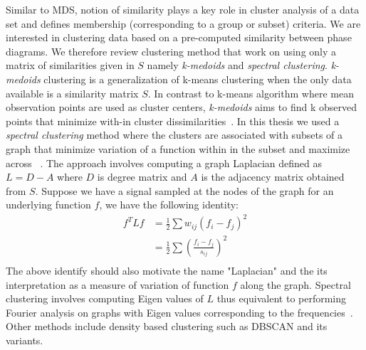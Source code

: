 Similar to MDS, notion of similarity plays a key role in cluster analysis of a data set and defines membership (corresponding to a group or subset) criteria. 
We are interested in clustering data based on a pre-computed similarity between phase diagrams. 
We therefore review clustering method that work on using only a matrix of similarities given in \(S\) namely \textit{k-medoids} and \textit{spectral clustering}. 
\textit{k-medoids} clustering is a generalization of k-means clustering when the only data available is a similarity matrix \(S\). 
In contrast to k-means algorithm where mean observation points are used as cluster centers, \textit{k-medoids} aims to find k observed points that minimize with-in cluster dissimilarities~\cite{ESL}. 
In this thesis we used a \textit{spectral clustering} method where the clusters are associated with subsets of a graph that minimize variation of a function within in the subset and maximize across ~\cite{SpectralClustering}. 
The approach involves computing a graph Laplacian defined as \(L = D-A\) where \(D\) is degree matrix and \(A\) is the adjacency matrix obtained from \(S\).
Suppose we have a signal sampled at the nodes of the graph for an underlying function \(f\), we have the following identity:
\begin{align}
    f^T L f &= \frac{1}{2}\sum w_{ij}(f_i -f_j)^2 \nonumber \\
            &= \frac{1}{2}\sum \left(\frac{f_i -f_j}{s_{ij}}\right)^2 \\
\end{align}
The above identify should also motivate the name "Laplacian" and the its interpretation as a measure of variation of function \(f\) along the graph.
Spectral clustering involves computing Eigen values of \(L\) thus equivalent to performing Fourier analysis on graphs with Eigen values corresponding to the frequencies~\cite{GFT}. 
Other methods include density based clustering such as DBSCAN and its variants.  
